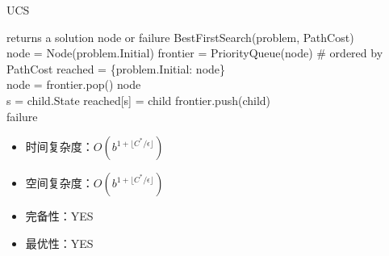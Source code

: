 \begin{algorithm}[H]
    \caption{UCS}
    \begin{algorithmic}[1]
         returns a solution node or failure
        \State \Return BestFirstSearch(problem, PathCost)
        \EndProcedure
        \\
        \State node = Node(problem.Initial)
        \State frontier = PriorityQueue(node)   \# ordered by PathCost
        \State reached = \{problem.Initial: node\}
        \\
        \State node = frontier.pop()
        \State \Return node
        \EndIf
        \\
        \State s = child.State
        \State reached[s] = child
        \State frontier.push(child)
        \EndIf
        \EndFor
        \EndWhile
        \\
        \State \Return failure
        \EndProcedure
    \end{algorithmic}
\end{algorithm}

\begin{itemize}
    \item 时间复杂度：$ O(b^{1 + \lfloor C^* / \epsilon \rfloor}) $
    \item 空间复杂度：$ O(b^{1 + \lfloor C^* / \epsilon \rfloor}) $
    \item 完备性：YES
    \item 最优性：YES
\end{itemize}

\newpage